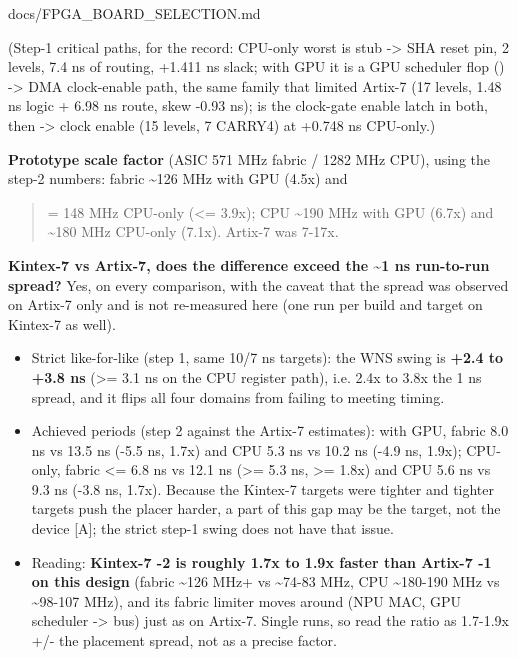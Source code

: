 \begin{relocated}{docs/FPGA_BOARD_SELECTION.md}
{}

(Step-1 critical paths, for the record: CPU-only  worst is
 stub  -\textgreater{} SHA 
reset pin, 2 levels, 7.4 ns of routing, +1.411 ns slack; with GPU it is
a GPU scheduler flop () -\textgreater{} DMA 
clock-enable path, the same family that limited Artix-7 (17 levels, 1.48
ns logic + 6.98 ns route, skew -0.93 ns);  is the
clock-gate enable latch in both, then 
-\textgreater{}   clock enable (15 levels, 7
CARRY4) at +0.748 ns CPU-only.)

\textbf{Prototype scale factor} (ASIC 571 MHz fabric / 1282 MHz CPU),
using the step-2 numbers: fabric \textasciitilde126 MHz with GPU (4.5x)
and

\begin{quote}
= 148 MHz CPU-only (\textless= 3.9x); CPU \textasciitilde190 MHz with
GPU (6.7x) and \textasciitilde180 MHz CPU-only (7.1x). Artix-7 was
7-17x.
\end{quote}

\textbf{Kintex-7 vs Artix-7, does the difference exceed the
\textasciitilde1 ns run-to-run spread?} Yes, on every comparison, with
the caveat that the spread was observed on Artix-7 only and is not
re-measured here (one run per build and target on Kintex-7 as well).

\begin{itemize}
\tightlist
\item
  Strict like-for-like (step 1, same 10/7 ns targets): the WNS swing is
  \textbf{+2.4 to +3.8 ns} (\textgreater= 3.1 ns on the CPU register
  path), i.e. 2.4x to 3.8x the 1 ns spread, and it flips all four
  domains from failing to meeting timing.
\item
  Achieved periods (step 2 against the Artix-7 estimates): with GPU,
  fabric 8.0 ns vs 13.5 ns (-5.5 ns, 1.7x) and CPU 5.3 ns vs 10.2 ns
  (-4.9 ns, 1.9x); CPU-only, fabric \textless= 6.8 ns vs 12.1 ns
  (\textgreater= 5.3 ns, \textgreater= 1.8x) and CPU 5.6 ns vs 9.3 ns
  (-3.8 ns, 1.7x). Because the Kintex-7 targets were tighter and tighter
  targets push the placer harder, a part of this gap may be the target,
  not the device {[}A{]}; the strict step-1 swing does not have that
  issue.
\item
  Reading: \textbf{Kintex-7 -2 is roughly 1.7x to 1.9x faster than
  Artix-7 -1 on this design} (fabric \textasciitilde126 MHz+ vs
  \textasciitilde74-83 MHz, CPU \textasciitilde180-190 MHz vs
  \textasciitilde98-107 MHz), and its fabric limiter moves around (NPU
  MAC, GPU scheduler -\textgreater{} bus) just as on Artix-7. Single
  runs, so read the ratio as 1.7-1.9x +/- the placement spread, not as a
  precise factor.
\end{itemize}


\end{relocated}
